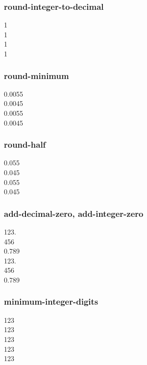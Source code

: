 \documentclass{article}
\begin{document}
\subsubsection{round-integer-to-decimal}
{
\num[round-mode = figures]{1} \\
\num[round-mode = places]{1} \\
\num[round-mode = figures]{1} \\
\num[round-mode = places]{1}\\
}

\subsubsection{round-minimum}
{
%
\num{0.0055} \\
\num{0.0045} \\
%
\num{0.0055} \\
\num{0.0045}\\
}

\subsubsection{round-half}
{
%
\num{0.055} \\
\num{0.045} \\
%
\num{0.055} \\
\num{0.045}
}

\subsubsection{add-decimal-zero, add-integer-zero}
{
\num{123.} \\
\num{456} \\
\num{.789} \\
%
\num{123.} \\
\num{456} \\
\num{.789}\\
}

\subsubsection{minimum-integer-digits}
\num{123} \\
\num[minimum-integer-digits = 1]{123} \\
\num[minimum-integer-digits = 2]{123} \\
\num[minimum-integer-digits = 3]{123} \\
\num[minimum-integer-digits = 4]{123}\\
\end{document}
